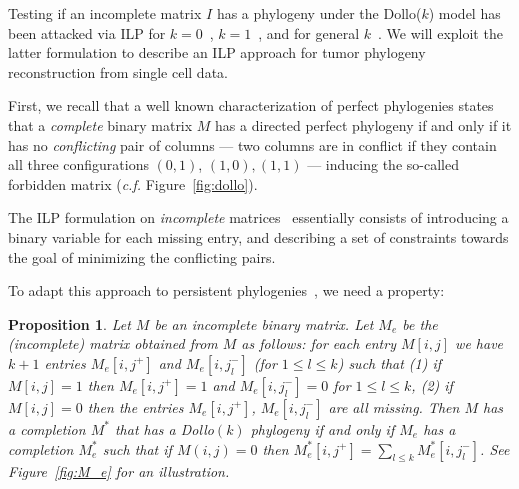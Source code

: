 \documentclass[a4paper,USenglish]{article}
\newtheorem{proposition}[theorem]{Proposition}
\theoremstyle{definition}
\begin{document}
Testing if an incomplete matrix $I$ has a phylogeny under the
Dollo($k$) model has been attacked via ILP for
$k=0$~\cite{Gusfield2007}, $k=1$~\cite{gusfield_persistent_2015}, and
for general $k$~\cite{Bonizzoni:2017:BPP:3107411.3107441}.  We will
exploit the latter formulation to describe an ILP approach for tumor
phylogeny reconstruction from single cell data.


First, we recall that a well known characterization of perfect
phylogenies states that a \emph{complete} binary matrix $M$ has a
directed perfect phylogeny if and only if it has no \emph{conflicting}
pair of columns --- two columns are in conflict if they contain all
three configurations $(0,1)$, $(1,0), (1,1)$ --- inducing the
so-called forbidden matrix (\emph{c.f.} Figure~\ref{fig:dollo}).

The ILP formulation on \emph{incomplete} matrices~\cite{Gusfield2007}
essentially consists of introducing a binary variable for each missing
entry, and describing a set of constraints towards the goal of
minimizing the conflicting pairs.

To adapt this approach to persistent
phylogenies~\cite{gusfield_persistent_2015}, we need a
property: 

\begin{proposition}
  \label{proposition:extended matrix}
  \cite{Bonizzoni:2017:BPP:3107411.3107441} Let $M$ be an incomplete
  binary matrix.  Let $M_{e}$ be the (incomplete) matrix obtained from
  $M$ as follows: for each entry $M[i,j]$ we have $k+1$ entries
  $M_{e}[i,j^{+}]$ and $M_{e}[i,j_{l}^{-}]$ (for $1\le l\le k$) such
  that (1) if $M[i,j] = 1$ then $M_{e}[i,j^{+}] = 1$ and
  $M_{e}[i,j_{l}^{-}] = 0$ for $1\le l\le k$, (2) if $M[i,j] = 0$ then
  the entries $M_{e}[i,j^{+}]$, $ M_{e}[i,j_{l}^{-}]$ are all missing.
  Then $M$ has a completion $M^{*}$ that has a Dollo$(k)$ phylogeny if
  and only if $M_{e}$ has a completion $M^{*}_{e}$ such that if
  $M(i,j)= 0$ then
  $M^{*}_{e}[i,j^{+}] = \sum_{l\le k} M^{*}_{e}[i,j_{l}^{-}]$.  See
  Figure~\ref{fig:M_e} for an illustration.
\end{proposition}
\end{document}

